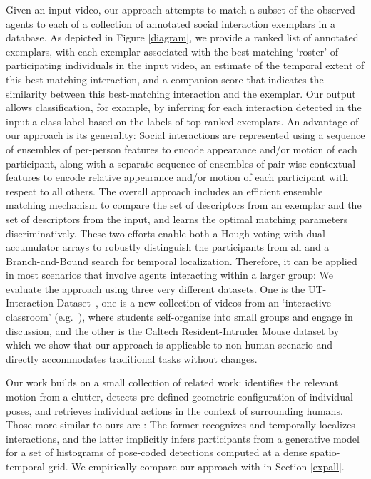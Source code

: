 Given an input video, our approach attempts to match a subset of the observed agents to each of a collection of annotated social interaction exemplars in a database. As depicted in Figure \ref{diagram}, we provide a ranked list of annotated exemplars, with each exemplar associated with the best-matching `roster' of participating individuals in the input video, an estimate of the temporal extent of this best-matching interaction, and a companion score that indicates the similarity between this best-matching interaction and the exemplar. Our output allows classification, for example, by inferring for each interaction detected in the input a class label based on the labels of top-ranked exemplars. An advantage of our approach is its generality: Social interactions are represented using a sequence of ensembles of per-person features to encode appearance and/or motion of each participant, along with a separate sequence of ensembles of pair-wise contextual features to encode relative appearance and/or motion of each participant with respect to all others. The overall approach includes an efficient ensemble matching mechanism to compare the set of descriptors from an exemplar and the set of descriptors from the input, and learns the optimal matching parameters discriminatively. These two efforts enable both a Hough voting with dual accumulator arrays to robustly distinguish the participants from all and a Branch-and-Bound search for temporal localization. Therefore, it can be applied in most scenarios that involve agents interacting within a larger group: We evaluate the approach using three very different datasets. One is the UT-Interaction Dataset~\cite{Ryoo:group}, one is a new collection of videos from an `interactive classroom' (e.g.~\cite{Crouch:PI}), where students self-organize into small groups and engage in discussion, and the other is the Caltech Resident-Intruder Mouse dataset \cite{CRIM13} by which we show that our approach is applicable to non-human scenario and directly accommodates traditional tasks without changes.

Our work builds on a small collection of related work: \cite{Li:segmentation} identifies the relevant motion from a clutter, \cite{Cristani:discovery} detects pre-defined geometric configuration of individual poses, and \cite{Lan:retrieval} retrieves individual actions in the context of surrounding humans. Those more similar to ours are \cite{Ryoo:group,Amer:group}: The former recognizes and temporally localizes interactions, and the latter implicitly infers participants from a generative model for a set of histograms of pose-coded detections computed at a dense spatio-temporal grid. We empirically compare our approach with \cite{Ryoo:group,Amer:group} in Section \ref{expall}.